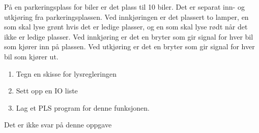 


På en parkeringsplass for biler er det plass til 10 biler. Det er
separat inn- og utkjøring fra parkeringsplassen. Ved innkjøringen
er det plassert to lamper, en som skal lyse grønt hvis det er ledige
plasser, og en som skal lyse rødt når det ikke er ledige plasser.
Ved innkjøring er det en bryter som gir signal for hver bil som kjører
inn på plassen. Ved utkjøring er det en bryter som gir signal for
hver bil som kjører ut.
\begin{enumerate}
\item Tegn en skisse for lysregleringen
\item Sett opp en IO liste
\item Lag et PLS program for denne funksjonen.
\end{enumerate}






Det er ikke svar på denne oppgave












